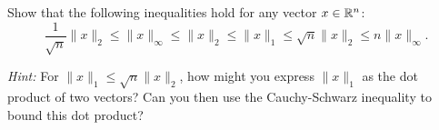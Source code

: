 \item Show that the following inequalities hold for any vector $x \in \mathbb{R}^{n}$:
\[
\frac{1}{\sqrt{n}}\|x\|_2 \leq \|x\|_\infty \leq  \|x\|_2 \leq \|x\|_1 \leq \sqrt{n} \|x\|_2 \le n\|x\|_\infty.
\]

\textit{Hint:} For $\|x\|_1\leq \sqrt{n}\|x\|_2$, how might you express $\|x\|_1$ as the dot product of two vectors? Can you then use the Cauchy-Schwarz inequality to bound this dot product?